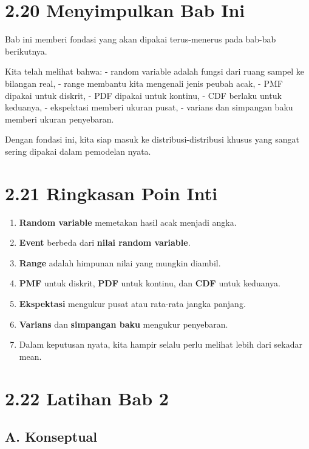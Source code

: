 \documentclass[
  letterpaper,
  DIV=11,
  numbers=noendperiod]{scrreprt}
\providecommand{\tightlist}{%
  \setlength{\itemsep}{0pt}\setlength{\parskip}{0pt}}
\begin{document}
\section{2.20 Menyimpulkan Bab Ini}\label{menyimpulkan-bab-ini-1}

Bab ini memberi fondasi yang akan dipakai terus-menerus pada bab-bab
berikutnya.

Kita telah melihat bahwa: - random variable adalah fungsi dari ruang
sampel ke bilangan real, - range membantu kita mengenali jenis peubah
acak, - PMF dipakai untuk diskrit, - PDF dipakai untuk kontinu, - CDF
berlaku untuk keduanya, - ekspektasi memberi ukuran pusat, - varians dan
simpangan baku memberi ukuran penyebaran.

Dengan fondasi ini, kita siap masuk ke distribusi-distribusi khusus yang
sangat sering dipakai dalam pemodelan nyata.

\section{2.21 Ringkasan Poin Inti}\label{ringkasan-poin-inti-1}

\begin{enumerate}
\def\labelenumi{\arabic{enumi}.}
\tightlist
\item
  \textbf{Random variable} memetakan hasil acak menjadi angka.
\item
  \textbf{Event} berbeda dari \textbf{nilai random variable}.
\item
  \textbf{Range} adalah himpunan nilai yang mungkin diambil.
\item
  \textbf{PMF} untuk diskrit, \textbf{PDF} untuk kontinu, dan
  \textbf{CDF} untuk keduanya.
\item
  \textbf{Ekspektasi} mengukur pusat atau rata-rata jangka panjang.
\item
  \textbf{Varians} dan \textbf{simpangan baku} mengukur penyebaran.
\item
  Dalam keputusan nyata, kita hampir selalu perlu melihat lebih dari
  sekadar mean.
\end{enumerate}

\section{2.22 Latihan Bab 2}\label{latihan-bab-2}

\subsection{A. Konseptual}\label{a.-konseptual-1}
\end{document}
